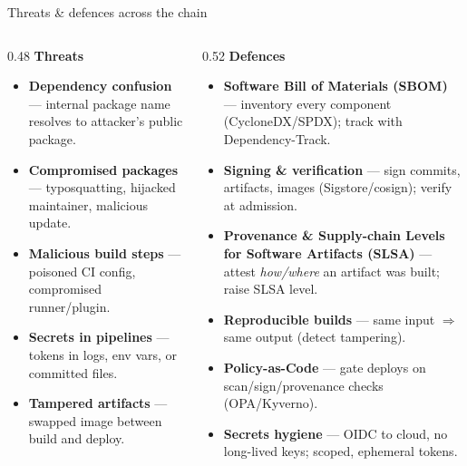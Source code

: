\documentclass[aspectratio=169,10pt]{beamer}
\newcommand{\term}[1]{{\color{awsink}\textbf{#1}}}
\begin{document}
\begin{frame}{Threats \& defences across the chain}
  \begin{columns}[T]
    \begin{column}{0.48\textwidth}
      \small\textbf{\color{bad}Threats}
      \begin{itemize}\footnotesize
        \item \term{Dependency confusion} --- internal package name resolves to attacker's public package.
        \item \term{Compromised packages} --- typosquatting, hijacked maintainer, malicious update.
        \item \term{Malicious build steps} --- poisoned CI config, compromised runner/plugin.
        \item \term{Secrets in pipelines} --- tokens in logs, env vars, or committed files.
        \item \term{Tampered artifacts} --- swapped image between build and deploy.
      \end{itemize}
    \end{column}
    \begin{column}{0.52\textwidth}
      \small\textbf{\color{good}Defences}
      \begin{itemize}\footnotesize
        \item \term{Software Bill of Materials (SBOM)} --- inventory every component (CycloneDX/SPDX); track with Dependency-Track.
        \item \term{Signing \& verification} --- sign commits, artifacts, images (Sigstore/cosign);
              verify at admission.
        \item \term{Provenance \& Supply-chain Levels for Software Artifacts (SLSA)} --- attest \emph{how/where} an artifact was built; raise SLSA level.
        \item \term{Reproducible builds} --- same input $\Rightarrow$ same output (detect tampering).
        \item \term{Policy-as-Code} --- gate deploys on scan/sign/provenance checks (OPA/Kyverno).
        \item \term{Secrets hygiene} --- OIDC to cloud, no long-lived keys; scoped, ephemeral tokens.
      \end{itemize}
    \end{column}
  \end{columns}
\end{frame}
\end{document}
